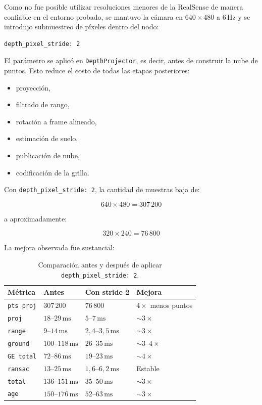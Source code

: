 Como no fue posible utilizar resoluciones menores de la RealSense de manera
confiable en el entorno probado, se mantuvo la cámara en $640 \times 480$ a
$6\,\mathrm{Hz}$ y se introdujo submuestreo de píxeles dentro del nodo:

\begin{verbatim}
depth_pixel_stride: 2
\end{verbatim}

El parámetro se aplicó en \texttt{DepthProjector}, es decir, antes de construir
la nube de puntos. Esto reduce el costo de todas las etapas posteriores:

\begin{itemize}
  \item proyección,
  \item filtrado de rango,
  \item rotación a frame alineado,
  \item estimación de suelo,
  \item publicación de nube,
  \item codificación de la grilla.
\end{itemize}

Con \texttt{depth\_pixel\_stride: 2}, la cantidad de muestras baja de:

\begin{equation}
  640 \times 480 = 307\,200
\end{equation}

a aproximadamente:

\begin{equation}
  320 \times 240 = 76\,800
\end{equation}

La mejora observada fue sustancial:

\begin{table}[H]
\centering
\begin{tabular}{llll}
\toprule
\textbf{Métrica} & \textbf{Antes} & \textbf{Con stride 2} & \textbf{Mejora} \\
\midrule
\texttt{pts proj} & $307\,200$ & $76\,800$ & $4\times$ menos puntos \\
\texttt{proj} & $18$--$29\,\mathrm{ms}$ & $5$--$7\,\mathrm{ms}$ & $\sim 3\times$ \\
\texttt{range} & $9$--$14\,\mathrm{ms}$ & $2{,}4$--$3{,}5\,\mathrm{ms}$ & $\sim 3\times$ \\
\texttt{ground} & $100$--$118\,\mathrm{ms}$ & $26$--$35\,\mathrm{ms}$ & $\sim 3$--$4\times$ \\
\texttt{GE total} & $72$--$86\,\mathrm{ms}$ & $19$--$23\,\mathrm{ms}$ & $\sim 4\times$ \\
\texttt{ransac} & $13$--$25\,\mathrm{ms}$ & $1{,}6$--$6{,}2\,\mathrm{ms}$ & Estable \\
\texttt{total} & $136$--$151\,\mathrm{ms}$ & $35$--$50\,\mathrm{ms}$ & $\sim 3\times$ \\
\texttt{age} & $150$--$176\,\mathrm{ms}$ & $52$--$63\,\mathrm{ms}$ & $\sim 3\times$ \\
\bottomrule
\end{tabular}
\caption{Comparación antes y después de aplicar \texttt{depth\_pixel\_stride: 2}.}
\label{tab:perf-depth-stride}
\end{table}

